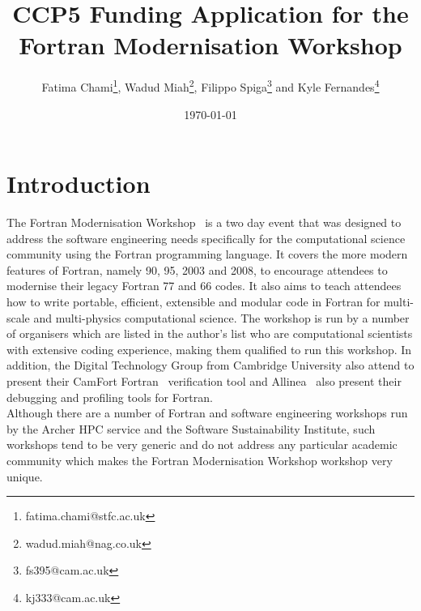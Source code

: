 \documentclass[12pt]{article}
\title{\bf CCP5 Funding Application for the Fortran Modernisation Workshop}
\author{Fatima Chami\footnote{fatima.chami@stfc.ac.uk},
  Wadud Miah\footnote{wadud.miah@nag.co.uk},
  Filippo Spiga\footnote{fs395@cam.ac.uk} and
  Kyle Fernandes\footnote{kj333@cam.ac.uk}}
\date{\today}
\begin{document}
\maketitle

%
\section{Introduction}
The Fortran Modernisation Workshop~\cite{fmw:nag} is a two day event
that was designed to
address the software engineering needs specifically for the computational science community using the Fortran programming language.
It covers the more modern features of Fortran, namely 90, 95, 2003 and 2008, to encourage attendees to modernise their legacy
Fortran 77 and 66 codes. It also aims to teach attendees how to write portable, efficient, extensible and modular code in Fortran for
multi-scale and multi-physics computational science. The workshop is run by a number of organisers which are listed in the author's
list who are computational scientists with extensive coding experience, making them qualified to run this workshop. In addition, the
Digital Technology Group from Cambridge University also attend to
present their CamFort Fortran~\cite{cam:naps} verification tool and Allinea~\cite{allinea} also present their debugging and
profiling tools for Fortran. \\

Although there are a number of Fortran and software engineering workshops run by the Archer HPC
service and the Software Sustainability Institute, such workshops tend to be very generic and do not address any particular
academic community which makes the Fortran Modernisation Workshop workshop very unique. \\
\end{document}
